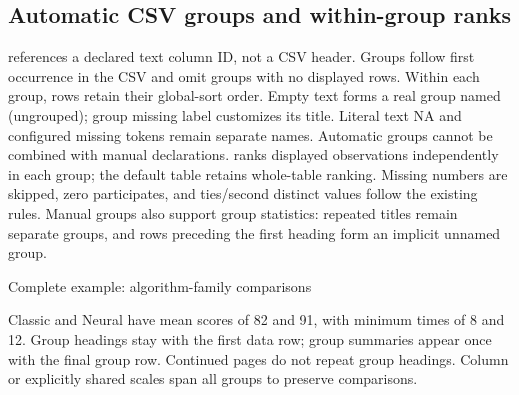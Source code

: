 \subsection{Automatic CSV groups and within-group ranks}
\begin{sloppypar}
 references a declared text column ID, not a CSV header.
Groups follow first occurrence in the CSV and omit groups with no displayed
rows. Within each group, rows retain their global-sort order. Empty text forms
a real group named (ungrouped); group missing label customizes its title.
Literal text NA and configured missing tokens remain separate names. Automatic
groups cannot be combined with manual  declarations.
 ranks displayed observations independently in each group;
the default table retains whole-table ranking. Missing numbers are skipped,
zero participates, and ties/second distinct values follow the existing rules.
Manual groups also support group statistics: repeated titles remain separate
groups, and rows preceding the first heading form an implicit unnamed group.
\end{sloppypar}
\begin{demo}{Complete example: algorithm-family comparisons}
\begin{center}
\begin{gradtable}[align=c,header align=c,data=families,width=\linewidth,style=academic,theme=teal,
  scale=column,group by=family,rank scope=group,group summary=true,
  sort keys={score/descending,time/ascending}]
\end{gradtable}
\end{center}
\end{demo}
Classic and Neural have mean scores of 82 and 91, with minimum times of 8 and
12. Group headings stay with the first data row; group summaries appear once
with the final group row. Continued pages do not repeat group headings.
Column or explicitly shared scales span all groups to preserve comparisons.
